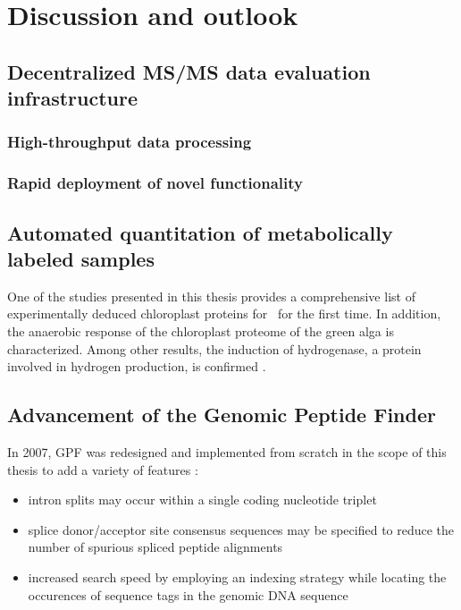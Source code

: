 \chapter{Discussion and outlook}

\section{Decentralized MS/MS data evaluation infrastructure}

\subsection{High-throughput data processing}

\subsection{Rapid deployment of novel functionality}

\section{Automated quantitation of metabolically labeled samples}

One of the studies presented in this thesis provides a comprehensive list of 
experimentally deduced chloroplast proteins for \cre~for the first time.
In addition, the anaerobic response of the chloroplast proteome of the green 
alga is characterized. 
Among other results, the induction of hydrogenase, a protein involved in 
hydrogen production, is confirmed \citep{Terashima2010}.

\section{Advancement of the Genomic Peptide Finder }

In 2007, GPF was redesigned and implemented from scratch in the scope of this
thesis to add a variety of features \citep{Specht2011_GPF}:

\begin{itemize}
\item intron splits may occur within a single coding nucleotide triplet
\item splice donor/acceptor site consensus sequences may be specified to
reduce the number of spurious spliced peptide alignments
\item increased search speed by employing an indexing strategy while locating
the occurences of sequence tags in the genomic DNA sequence
\end{itemize}

